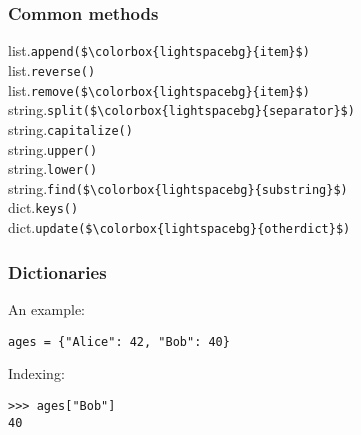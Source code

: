 \documentclass[12pt,twocolumn]{article}
\begin{document}
	\subsubsection*{Common methods}
	
	list.\lstinline|append($\colorbox{lightspacebg}{item}$)| \\
	list.\lstinline|reverse()| \\
	list.\lstinline|remove($\colorbox{lightspacebg}{item}$)| \\
	
	string.\lstinline|split($\colorbox{lightspacebg}{separator}$)| \\
	string.\lstinline|capitalize()| \\
	string.\lstinline|upper()| \\
	string.\lstinline|lower()| \\
	string.\lstinline|find($\colorbox{lightspacebg}{substring}$)| \\
	
	dict.\lstinline|keys()| \\
	dict.\lstinline|update($\colorbox{lightspacebg}{otherdict}$)| \\
	
	\subsubsection*{Dictionaries}
	
	An example:
	\begin{lstlisting}
ages = {"Alice": 42, "Bob": 40}\end{lstlisting}
	Indexing:
	\begin{lstlisting}
>>> ages["Bob"]
40\end{lstlisting}
\end{document}
